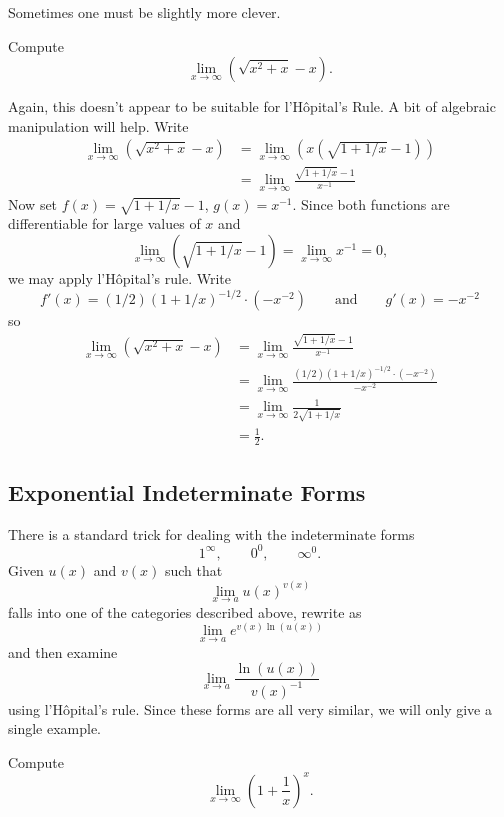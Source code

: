 Sometimes one must be slightly more clever. 

\begin{example}[$\pmb\infty$--$\pmb\infty$]
Compute
\[
\lim_{x\to\infty}\left(\sqrt{x^2+x}-x\right).
\]
\end{example}

\begin{solution}
Again, this doesn't appear to be suitable for l'H\^opital's Rule. A bit of algebraic manipulation will help. Write
\begin{align*}
\lim_{x\to\infty}\left(\sqrt{x^2+x}-x\right) &= \lim_{x\to\infty}\left(x\left(\sqrt{1+1/x}-1\right)\right)\\
&=\lim_{x\to\infty}\frac{\sqrt{1+1/x}-1}{x^{-1}}
\end{align*}
Now set $f(x) = \sqrt{1+1/x}-1$, $g(x) = x^{-1}$. Since both
  functions are differentiable for large values of $x$ and 
\[
\lim_{x\to\infty} (\sqrt{1+1/x}-1) = \lim_{x\to\infty}x^{-1} = 0, 
\]
we may apply l'H\^opital's rule. Write
\[
f'(x) = (1/2)(1+1/x)^{-1/2}\cdot(-x^{-2}) \qquad \text{and}\qquad g'(x) = -x^{-2}
\]
so
\begin{align*}
\lim_{x\to\infty}\left(\sqrt{x^2+x}-x\right) &= \lim_{x\to\infty}\frac{\sqrt{1+1/x}-1}{x^{-1}} \\
&= \lim_{x\to\infty}\frac{(1/2)(1+1/x)^{-1/2}\cdot(-x^{-2})}{-x^{-2}} \\
&= \lim_{x\to\infty} \frac{1}{2\sqrt{1+1/x}}\\
&= \frac{1}{2}.
\end{align*}
\end{solution}


\subsection*{Exponential Indeterminate Forms}

There is a standard trick for dealing with the indeterminate forms
\[
1^\infty,\qquad 0^0,\qquad \infty^0.
\]
Given $u(x)$ and $v(x)$ such that
\[
\lim_{x\to a}u(x)^{v(x)}
\]
falls into one of the categories described above, rewrite as
\[
\lim_{x\to a}e^{v(x)\ln(u(x))}
\]
and then examine 
\[
\lim_{x\to a} \frac{\ln(u(x))}{v(x)^{-1}}
\]
using l'H\^opital's rule.  Since these forms are all very similar, we
will only give a single example.


\begin{example}
Compute
\[
\lim_{x\to \infty}\left(1 + \frac{1}{x}\right)^x.
\]
\end{example}

